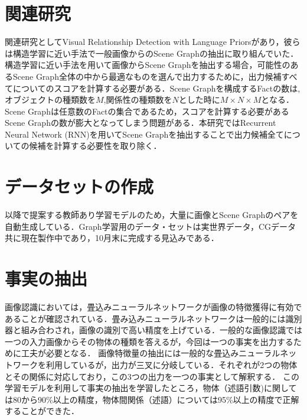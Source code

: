 \section{関連研究}

関連研究としてVisual Relationship Detection with Language Priors\cite{language_prior}があり，彼らは構造学習に近い手法で一般画像からのScene Graphの抽出に取り組んでいた．構造学習に近い手法を用いて画像からScene Graphを抽出する場合，可能性のあるScene Graph全体の中から最適なものを選んで出力するために，出力候補すべてについてのスコアを計算する必要がある．Scene Graphを構成するFactの数は,
オブジェクトの種類数を$M$,関係性の種類数を$N$とした時に$M \times N \times M$となる．Scene Graphは任意数のFactの集合であるため，スコアを計算する必要があるScene Graphの数が膨大となってしまう問題がある．本研究ではRecurrent Neural Network (RNN)を用いてScene Graphを抽出することで出力候補全てについての候補を計算する必要性を取り除く．



\section{データセットの作成}
以降で提案する教師あり学習モデルのため，大量に画像とScene Graphのペアを自動生成している．Graph学習用のデータ・セットは実世界データ，CGデータ共に現在製作中であり，10月末に完成する見込みである．


\section{事実の抽出}
画像認識においては，畳込みニューラルネットワークが画像の特徴獲得に有効であることが確認されている．畳み込みニューラルネットワークは一般的には識別器と組み合わされ，画像の識別で高い精度を上げている．一般的な画像認識では一つの入力画像からその物体の種類を答えるが，今回は一つの事実を出力するために工夫が必要となる．
画像特徴量の抽出には一般的な畳込みニューラルネットワークを利用しているが，出力が三叉に分岐している．それぞれが2つの物体とその関係に対応しており，この3つの出力を一つの事実として解釈する．
この学習モデルを利用して事実の抽出を学習したところ，物体（述語引数)に関しては80から90\%以上の精度，物体間関係（述語）については95\%以上の精度で正解することができた．

